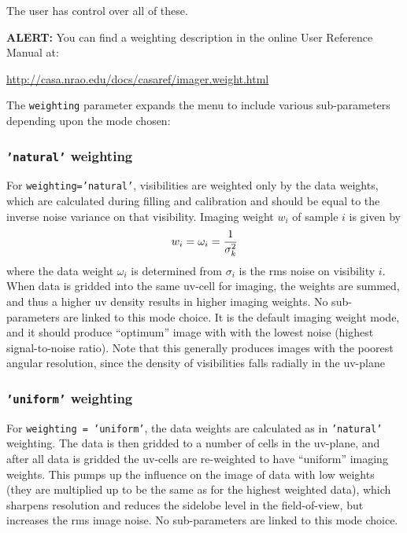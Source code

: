 The user has control over all of these.

{\bf ALERT:} You can find a weighting description in the online
User Reference Manual at:

\url{http://casa.nrao.edu/docs/casaref/imager.weight.html}


The {\tt weighting} parameter expands the menu to include various 
sub-parameters depending upon the mode chosen:

\subsubsection{{\tt 'natural'} weighting }
\label{section:im.pars.weighting.natural}

For {\tt weighting='natural'}, visibilities are weighted only by the
data weights, which are calculated during filling and calibration and
should be equal to the inverse noise variance on that visibility.
Imaging weight $w_i$ of sample $i$ is given by
\begin{equation}
  w_i = \omega_i = {1 \over \sigma^2_k}
\end{equation}
where the data weight $\omega_i$ is determined from $\sigma_i$ is the
rms noise on visibility $i$.
When data is gridded into the same uv-cell for imaging, the weights
are summed, and thus a higher uv density results in higher imaging
weights.  No sub-parameters are linked to this mode choice.  It is the
default imaging weight mode, and it should produce ``optimum'' image
with with the lowest noise (highest signal-to-noise ratio).  Note that
this generally produces images with the poorest angular resolution,
since the density of visibilities falls radially in the uv-plane

\subsubsection{{\tt 'uniform'} weighting }
\label{section:im.pars.weighting.uniform}

For {\tt weighting = 'uniform'}, the data weights are calculated
as in {\tt 'natural'} weighting.  The data is then gridded to
a number of cells in the uv-plane, and after all data is gridded
the uv-cells are re-weighted to have ``uniform'' imaging weights.
This pumps
up the influence on the image of data with low weights (they are
multiplied up to be the same as for the highest weighted data), which
sharpens resolution and reduces the sidelobe level in the
field-of-view, but increases the rms image noise. No sub-parameters are
linked to this mode choice.

